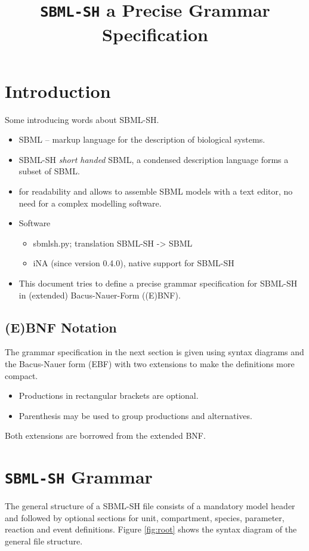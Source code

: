 \documentclass[a4paper]{article}
\title{\texttt{SBML-SH} a Precise Grammar Specification}
\begin{document}
\lstset{basicstyle=\small\ttfamily}

\maketitle

\section{Introduction}
Some introducing words about SBML-SH.
\begin{itemize}
\item SBML -- markup language for the description of biological systems. 
\item SBML-SH \emph{short handed} SBML, a condensed description language forms a subset of SBML. 
\item for readability and allows to assemble SBML models with a text editor, no need for a complex modelling software.
\item Software 
\begin{itemize}
\item sbmlsh.py; translation SBML-SH -> SBML
\item iNA (since version 0.4.0), native support for SBML-SH
\end{itemize}
\item This document tries to define a precise grammar specification for SBML-SH in (extended) Bacus-Nauer-Form ((E)BNF).
\end{itemize}

\subsection{(E)BNF Notation}
The grammar specification in the next section is given using syntax diagrams and the Bacus-Nauer form (EBF) with two extensions to make the definitions more compact.

\begin{itemize}
  \item Productions in rectangular brackets are optional.
  \item Parenthesis may be used to group productions and alternatives.
\end{itemize}

Both extensions are borrowed from the extended BNF.


\section{\texttt{SBML-SH} Grammar}
The general structure of a SBML-SH file consists of a mandatory model header and followed by optional sections for unit, compartment, species, parameter, reaction and event definitions. Figure \ref{fig:root} shows the syntax diagram of the general file structure.
\end{document}
